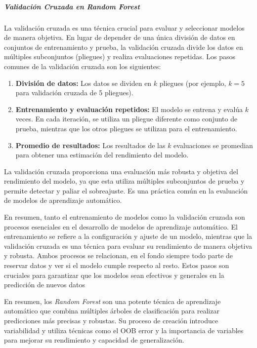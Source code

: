 \subparagraph{Validación Cruzada en \textit{Random Forest}}

La validación cruzada es una técnica crucial para evaluar y seleccionar modelos de manera objetiva. En lugar de depender de una única división de datos en conjuntos de entrenamiento y prueba, la validación cruzada divide los datos en múltiples subconjuntos (pliegues) y realiza evaluaciones repetidas. Los pasos comunes de la validación cruzada son los siguientes:

\begin{enumerate}
  \item \textbf{División de datos:} Los datos se dividen en $k$ pliegues (por ejemplo, $k=5$ para validación cruzada de 5 pliegues).
  
  \item \textbf{Entrenamiento y evaluación repetidos:} El modelo se entrena y evalúa $k$ veces. En cada iteración, se utiliza un pliegue diferente como conjunto de prueba, mientras que los otros pliegues se utilizan para el entrenamiento.
  
  \item \textbf{Promedio de resultados:} Los resultados de las $k$ evaluaciones se promedian para obtener una estimación del rendimiento del modelo.
\end{enumerate}

La validación cruzada proporciona una evaluación más robusta y objetiva del rendimiento del modelo, ya que esta utiliza múltiples subconjuntos de prueba y permite detectar y paliar el sobreajuste. Es una práctica común en la evaluación de modelos de aprendizaje automático.

En resumen, tanto el entrenamiento de modelos como la validación cruzada son procesos esenciales en el desarrollo de modelos de aprendizaje automático. El entrenamiento se refiere a la configuración y ajuste de un modelo, mientras que la validación cruzada es una técnica para evaluar su rendimiento de manera objetiva y robusta. Ambos procesos se relacionan, en el fondo siempre todo parte de reservar datos y ver si el modelo cumple respecto al resto. Estos pasos son cruciales para garantizar que los modelos sean efectivos y generales en la predicción de nuevos datos


\vspace{10pt}

En resumen, los \textit{Random Forest} son una potente técnica de aprendizaje automático que combina múltiples árboles de clasificación para realizar predicciones más precisas y robustas. Su proceso de creación introduce variabilidad y utiliza técnicas como el OOB error y la importancia de variables para mejorar su rendimiento y capacidad de generalización.

